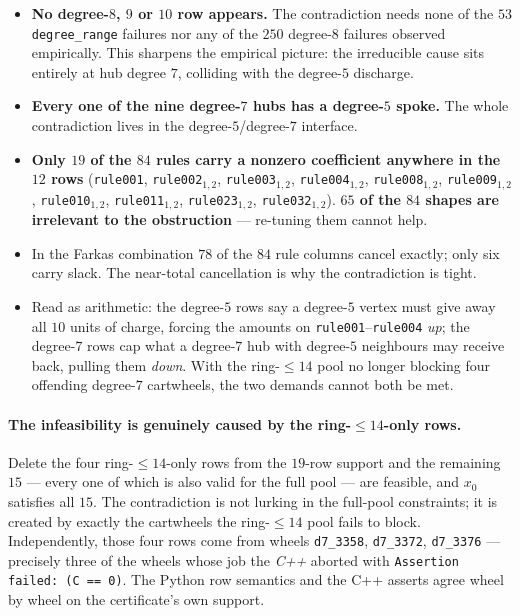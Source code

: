 \documentclass[11pt]{article}
\theoremstyle{definition}
\begin{document}
\begin{itemize}
  \item \textbf{No degree-$8$, $9$ or $10$ row appears.} The contradiction needs none
        of the $53$ \texttt{degree\_range} failures nor any of the $250$ degree-$8$
        failures observed empirically. This sharpens the empirical picture: the
        irreducible cause sits entirely at hub degree $7$, colliding with the
        degree-$5$ discharge.
  \item \textbf{Every one of the nine degree-$7$ hubs has a degree-$5$ spoke.} The
        whole contradiction lives in the degree-$5$/degree-$7$ interface.
  \item \textbf{Only $19$ of the $84$ rules carry a nonzero coefficient anywhere in
        the $12$ rows} (\texttt{rule001}, \texttt{rule002}$_{1,2}$,
        \texttt{rule003}$_{1,2}$, \texttt{rule004}$_{1,2}$, \texttt{rule008}$_{1,2}$,
        \texttt{rule009}$_{1,2}$, \texttt{rule010}$_{1,2}$, \texttt{rule011}$_{1,2}$,
        \texttt{rule023}$_{1,2}$, \texttt{rule032}$_{1,2}$).
        \textbf{$65$ of the $84$ shapes are irrelevant to the obstruction} ---
        re-tuning them cannot help.
  \item In the Farkas combination $78$ of the $84$ rule columns cancel exactly; only
        six carry slack. The near-total cancellation is why the contradiction is
        tight.
  \item Read as arithmetic: the degree-$5$ rows say a degree-$5$ vertex must give
        away all $10$ units of charge, forcing the amounts on
        \texttt{rule001}--\texttt{rule004} \emph{up}; the degree-$7$ rows cap what a
        degree-$7$ hub with degree-$5$ neighbours may receive back, pulling them
        \emph{down}. With the ring-$\le14$ pool no longer blocking four offending
        degree-$7$ cartwheels, the two demands cannot both be met.
\end{itemize}

\paragraph{The infeasibility is genuinely caused by the ring-$\le14$-only rows.}
Delete the four ring-$\le14$-only rows from the $19$-row support and the remaining
$15$ --- every one of which is also valid for the full pool --- are feasible, and
$x_0$ satisfies all $15$. The contradiction is not lurking in the full-pool
constraints; it is created by exactly the cartwheels the ring-$\le14$ pool fails to
block. Independently, those four rows come from wheels \texttt{d7\_3358},
\texttt{d7\_3372}, \texttt{d7\_3376} --- precisely three of the wheels whose job the
\emph{C++} aborted with \texttt{Assertion failed: (C == 0)}. The Python row semantics
and the C++ asserts agree wheel by wheel on the certificate's own support.
\end{document}
